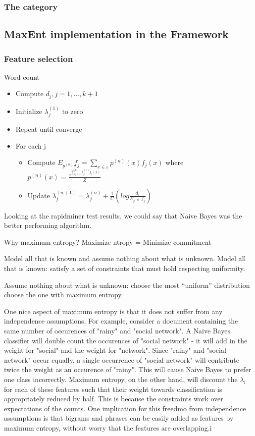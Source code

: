 \subsubsection{The  category}

\subsection{MaxEnt implementation in the Framework}


\subsubsection{Feature selection}
Word count

\begin{itemize}
\item Compute $d_j, j=1,...,k+1$
\item Initialize $\lambda_j^{(1)}$ to zero
\item Repeat until converge
\item For each j 
  \begin{itemize}
  \item Compute $E_{p^{(n)}} f_j = \sum\limits_{x \in \varepsilon} p^{(n)} (x)f_j(x)$
    where $p^{(n)}(x) = \frac{e^{\sum\limits_{j=1}^{k+1}\lambda_j^{(n)}f_j(x)}}{Z}$ 
  \item Update $\lambda_j^{(n+1)} = \lambda_j^{(n)} + \frac{1}{C}(log\frac{d_i}{E_{{p^{(n)}}}f_j})$
  \end{itemize}
\end{itemize}

  
Looking at the rapidminer test results, we could say that Naive Bayes was the better performing algorithm. 

Why maximum entropy?
Maximize ntropy = Minimize commitment

Model all that is known and assume nothing about what is unknown. 
Model all that is known: satisfy a set of constraints that must hold respecting uniformity.

Assume nothing about what is unknown: 
   choose the most “uniform” distribution 
   choose the one with maximum entropy

One nice aspect of maximum entropy is that it does not suffer from any independence assumptions. For example, consider a document containing the same number of occurences of
"rainy" and "social network". A Naive Bayes classifier will double count the occurences of "social network" - it will add in the weight for "social" and the weight for "network". Since "rainy" and
"social network" occur equally, a single occurrence of "social network" will contribute twice the weight as an occurence of "rainy". This will cause Naive Bayes to prefer one class incorrectly.
Maximum entropy, on the other hand, will discount the $\lambda_i$ for each of these features such that their weight towards classification is appropriately reduced by half.
This is because the constraints work over expectations of the counts. One implication for this freedmo from independence assumptions is that bigrams and phrases can be easily added as features 
by maximum entropy, without worry that the features are overlapping.i


